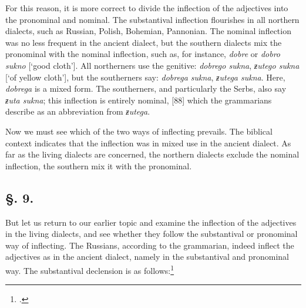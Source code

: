 For this reason, it is more correct to divide the inflection of the adjectives into the pronominal and nominal. The substantival inflection flourishes in all northern dialects, such as Russian, Polish, Bohemian, Pannonian. The nominal inflection was no less frequent in the ancient dialect, but the southern dialects mix the pronominal with the nominal inflection, such as, for instance, \textit{dobre} or \textit{dobro sukno} [‘good cloth’]. All northerners use the genitive: \textit{dobrego sukna}, \textit{ƶutego sukna} [‘of yellow cloth’], but the southerners say: \textit{dobrega sukna}, \textit{ƶutega sukna}. Here, \textit{dobrega} is a mixed form. The southerners, and particularly the Serbs, also say \textit{ƶuta sukna}; this inflection is entirely nominal, [88] which the grammarians describe as an abbreviation from \textit{ƶutega}.

Now we must see which of the two ways of inflecting prevails. The biblical context indicates that the inflection was in mixed use in the ancient dialect. As far as the living dialects are concerned, the northern dialects exclude the nominal inflection, the southern mix it with the pronominal.

\subsection*{\hspace*{\fill}§. 9.\hspace*{\fill}}

But let us return to our earlier topic and examine the inflection of the adjectives in the living dialects, and see whether they follow the substantival or pronominal way of inflecting. The Russians, according to the grammarian, indeed inflect the adjectives as in the ancient dialect, namely in the substantival and pronominal way. The substantival declension is as follows:\footnote{\citet[223]{puchmayer_lehrgebaude_1820}.}

